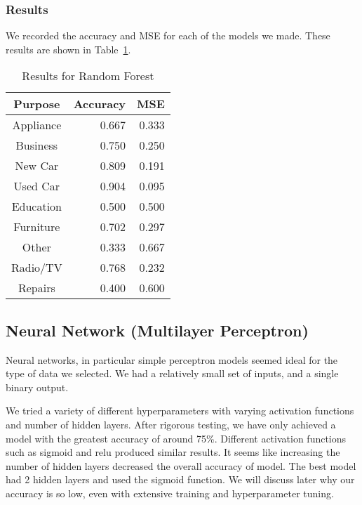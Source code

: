 \documentclass[12pt,twocolumn]{article}
\begin{document}
\subsubsection{Results}

We recorded the accuracy and MSE for each of the models we made. These results are shown in Table~\ref{tab:random_forest_results}.


\begin{table}
    \centering
    \begin{tabular}{|c|r|r|}
        \hline
        Purpose & Accuracy & MSE \\
        \hline
        \hline
        Appliance & 0.667 & 0.333 \\
        \hline
        Business & 0.750 & 0.250 \\
        \hline
        New Car & 0.809 & 0.191 \\
        \hline
        Used Car & 0.904 & 0.095 \\
        \hline
        Education & 0.500 & 0.500 \\
        \hline
        Furniture & 0.702 & 0.297 \\
        \hline
        Other & 0.333 & 0.667 \\
        \hline
        Radio/TV & 0.768 & 0.232 \\
        \hline
        Repairs & 0.400 & 0.600 \\
        \hline
    \end{tabular}
    \caption{Results for Random Forest}\label{tab:random_forest_results}
\end{table}


\subsection{Neural Network (Multilayer Perceptron)}
Neural networks, in particular simple perceptron models seemed ideal for the type of data we selected. We had a relatively small set of inputs, and a single binary output. 

We tried a variety of different hyperparameters with varying activation functions and number of hidden layers. After rigorous testing, we have only achieved a model with the greatest accuracy of around 75\%. Different activation functions such as sigmoid and relu produced similar results. It seems like increasing the number of hidden layers decreased the overall accuracy of model. The best model had 2 hidden layers and used the sigmoid function. We will discuss later why our accuracy is so low, even with extensive training and hyperparameter tuning.
\end{document}
